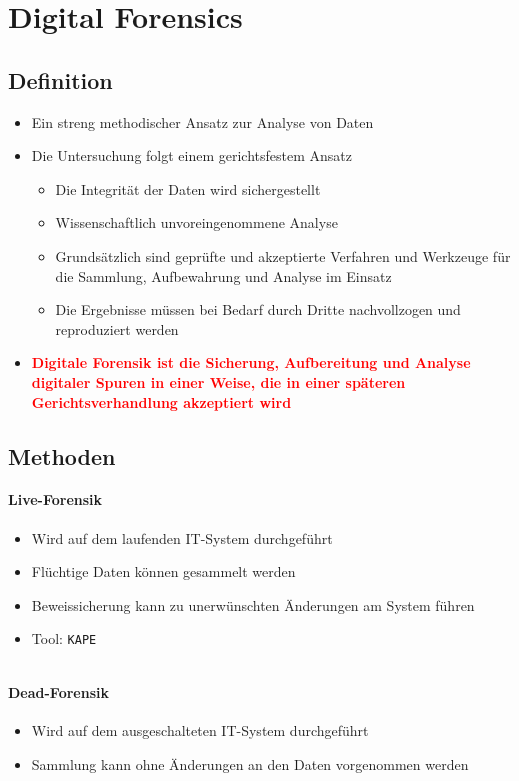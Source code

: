 \section{Digital Forensics}

\subsection{Definition}
\begin{itemize}
    \item Ein streng methodischer Ansatz zur Analyse von Daten
    \item Die Untersuchung folgt einem gerichtsfestem Ansatz
    \begin{itemize}
        \item Die Integrität der Daten wird sichergestellt
        \item Wissenschaftlich unvoreingenommene Analyse
        \item Grundsätzlich sind geprüfte und akzeptierte Verfahren und Werkzeuge für die Sammlung, Aufbewahrung und Analyse im Einsatz
        \item Die Ergebnisse müssen bei Bedarf durch Dritte nachvollzogen und reproduziert werden
    \end{itemize}
    \item \textbf{\textcolor{red}{Digitale Forensik ist die Sicherung, Aufbereitung und Analyse digitaler Spuren in einer Weise, die in einer späteren Gerichtsverhandlung akzeptiert wird}}
\end{itemize}

\subsection{Methoden}

\begin{minipage}{0.4\linewidth}
    \paragraph{Live-Forensik}
    \begin{itemize}
        \item Wird auf dem laufenden IT-System durchgeführt
        \item Flüchtige Daten können gesammelt werden
        \item Beweissicherung kann zu unerwünschten Änderungen am System führen
        \item Tool: \lstinline|KAPE|
    \end{itemize}
    $ $
\end{minipage}
\begin{minipage}{0.5\linewidth}
    \paragraph{Dead-Forensik}
    \begin{itemize}
        \item Wird auf dem ausgeschalteten IT-System durchgeführt
        \item Sammlung kann ohne Änderungen an den Daten vorgenommen werden
    \end{itemize}
\end{minipage}

